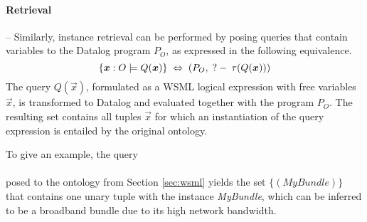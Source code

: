 \paragraph{Retrieval} -- Similarly, instance retrieval can be
performed by posing queries that contain variables to the Datalog
program $P_O$, as expressed in the following equivalence.
\begin{displaymath}
    \{\vec{x} : O \models Q(\vec{x})\} \; \Leftrightarrow \; (P_O, \qury \tau(Q(\vec{x})))
\end{displaymath}
The query $Q(\vec{x})$, formulated as a WSML logical expression
with free variables $\vec{x}$, is transformed to Datalog and
evaluated together with the program $P_O$. The resulting set
contains all tuples $\vec{x}$ for which an instantiation of the
query expression is entailed by the original ontology.

To give an example, the query\\
\phantom{mmmmm}   \\
posed to the ontology from Section \ref{sec:wsml} yields the set
$\{ (\textit{MyBundle}) \}$ that contains one unary tuple with the
instance \textit{MyBundle}, which can be inferred to be a
broadband bundle due to its high network bandwidth.

%
